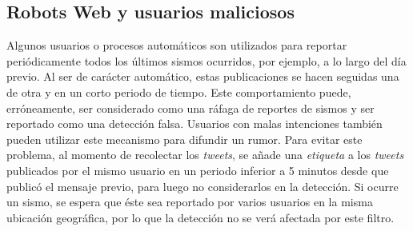 \subsection{Robots Web y usuarios maliciosos}
\label{subsec:bots}
Algunos usuarios o procesos automáticos son utilizados para reportar periódicamente todos los últimos sismos ocurridos, por ejemplo, a lo largo del día previo. 
%
Al ser de carácter automático, estas publicaciones se hacen seguidas una de otra y en un corto periodo de tiempo. 
%
Este comportamiento puede, erróneamente, ser considerado como una ráfaga de reportes de sismos y ser reportado como una detección falsa.  
%
Usuarios con malas intenciones también pueden utilizar este mecanismo para difundir un rumor. 
%
Para evitar este problema, al momento de recolectar los \textit{tweets}, se añade una \textit{etiqueta} a los \textit{tweets} publicados por el mismo usuario en un periodo inferior a 5 minutos desde que publicó el mensaje previo, para luego no considerarlos en la detección. 
%
Si ocurre un sismo, se espera que éste sea reportado por varios usuarios en la misma ubicación geográfica, por lo que la detección no se verá afectada por este filtro.

%
%

